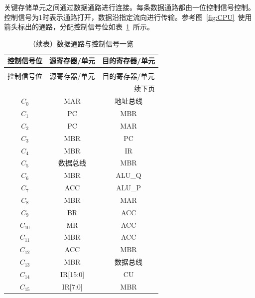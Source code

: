 \documentclass[lang=cn,a4paper,newtx]{elegantpaper}
\begin{document}
关键存储单元之间通过数据通路进行连接。每条数据通路都由一位控制信号控制。控制信号为1时表示通路打开，数据沿指定流向进行传输。参考图~\ref{fig:CPU}~使用箭头标出的通路，分配控制信号位如表~\ref{tab:CPU:DataPath}~所示。
\begin{longtable}{c c c}
  \caption{寄存器控制信号一览} \label{tab:CPU:DataPath} \\
  \toprule
  控制信号位 & 源寄存器/单元  & 目的寄存器/单元   \\
  \midrule
  \endfirsthead

  \caption[]{（续表）数据通路与控制信号一览} \\
  \toprule
  控制信号位 & 源寄存器/单元  & 目的寄存器/单元  \\
  \midrule
  \endhead

  \midrule
  \multicolumn{3}{r}{续下页} \\
  \midrule
  \endfoot

  \bottomrule
  \endlastfoot

  $C_0 $ & MAR   & 地址总线  \\
  $C_1 $ & PC    & MBR  \\
  $C_2 $ & PC    & MAR  \\
  $C_3 $ & MBR   & PC  \\
  $C_4 $ & MBR   & IR  \\
  $C_5 $ & 数据总线 & MBR  \\
  $C_6 $ & MBR   & ALU\_Q \\
  $C_7 $ & ACC   & ALU\_P  \\
  $C_8 $ & MBR   & MAR  \\
  $C_9 $ & BR   & ACC  \\
  $C_{10}$ & MR   & ACC    \\
  $C_{11}$ & MBR   & ACC  \\
  $C_{12}$ & ACC   & MBR  \\
  $C_{13}$ & MBR   & 数据总线  \\
  $C_{14}$ & IR[15:0]    & CU  \\
  $C_{15}$ & IR[7:0]    & MBR \\
\end{longtable}
\end{document}
